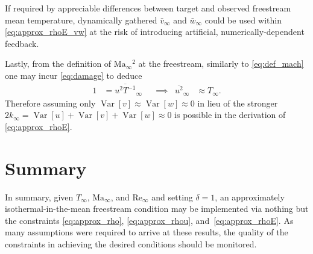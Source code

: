 \documentclass[letterpaper,11pt,nointlimits,reqno]{amsart}
\newcommand{\Mach}[1][]{\mbox{Ma}_{#1}}
\newcommand{\Reynolds}[1][]{\mbox{Re}_{#1}}
\newcommand{\Var}[1]{\ensuremath{\operatorname{Var}\left[{#1}\right]}}
\begin{document}
If required by appreciable differences between target and observed freestream
mean temperature, dynamically gathered $\bar{v}_\infty$ and $\bar{w}_\infty$
could be used within \eqref{eq:approx_rhoE_vw} at the risk of introducing
artificial, numerically-dependent feedback.

Lastly, from the definition of $\Mach[\infty]{}^2$ at the freestream, similarly
to \eqref{eq:def_mach} one may incur \eqref{eq:damage} to deduce
\begin{align}
  \label{eq:def_mach2}
  1 &= \overline{u^2 T^{-1}}_\infty
  &
  &\implies
  &
  \overline{u^2}_\infty &\approx T_\infty
  .
\end{align}
Therefore assuming only $\Var{v} \approx \Var{w} \approx 0$ in lieu of the
stronger $2 k_\infty = \Var{u} + \Var{v} + \Var{w} \approx 0$ is possible
in the derivation of \eqref{eq:approx_rhoE}.

\section{Summary}

In summary, given $T_\infty$, $\Mach[\infty]{}$, and $\Reynolds[\infty]{}$ and
setting $\delta=1$, an approximately isothermal-in-the-mean freestream
condition may be implemented via nothing but the constraints
\eqref{eq:approx_rho}, \eqref{eq:approx_rhou}, and~\eqref{eq:approx_rhoE}.  As
many assumptions were required to arrive at these results, the quality of the
constraints in achieving the desired conditions should be monitored.
\end{document}
